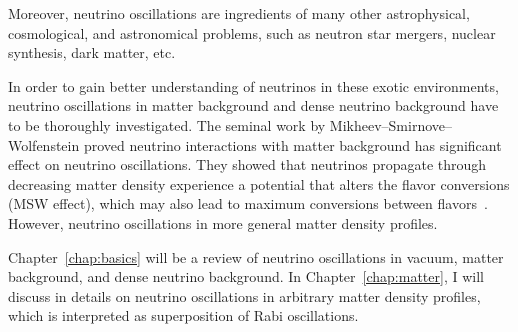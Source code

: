 Moreover, neutrino oscillations are ingredients of many other astrophysical, cosmological, and astronomical problems, such as neutron star mergers, nuclear synthesis, dark matter, etc. 

In order to gain better understanding of neutrinos in these exotic environments, neutrino oscillations in matter background and dense neutrino background have to be thoroughly investigated. The seminal work by Mikheev--Smirnove--Wolfenstein proved neutrino interactions with matter background has significant effect on neutrino oscillations. They showed that neutrinos propagate through decreasing matter density experience a potential that alters the flavor conversions (MSW effect), which may also lead to maximum conversions between flavors~\cite{Mikheev:1986gs,wolf78,wolfensteinprd1979}. However, neutrino oscillations in more general matter density profiles.

Chapter~\ref{chap:basics} will be a review of neutrino oscillations in vacuum, matter background, and dense neutrino background. In Chapter~\ref{chap:matter}, I will discuss in details on neutrino oscillations in arbitrary matter density profiles, which is interpreted as superposition of Rabi oscillations.


